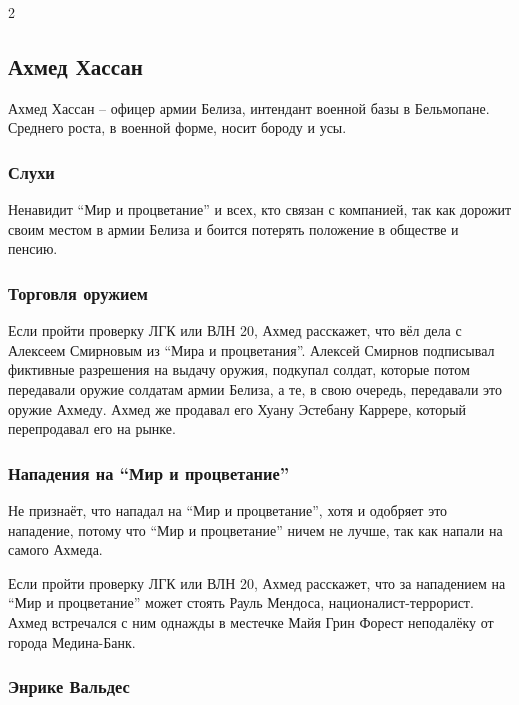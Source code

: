 \documentclass[twoside]{article}
\begin{document}
\begin{multicols}{2}
\subsection{Ахмед Хассан}\label{ahmed-hassan}

Ахмед Хассан -- офицер армии Белиза, интендант военной базы в
Бельмопане. Среднего роста, в военной форме, носит бороду и усы.

\subsubsection{Слухи}\label{rumors-hassan}

Ненавидит \enquote{Мир и процветание} и всех, кто связан с компанией, так как
дорожит своим местом в армии Белиза и боится потерять положение в
обществе и пенсию.

\subsubsection{Торговля оружием}\label{arms-trading-hassan}

Если пройти проверку ЛГК или ВЛН 20, Ахмед расскажет, что вёл дела с Алексеем
Смирновым из \enquote{Мира и процветания}. Алексей Смирнов подписывал фиктивные
разрешения на выдачу оружия, подкупал солдат, которые потом передавали
оружие солдатам армии Белиза, а те, в свою очередь, передавали это
оружие Ахмеду. Ахмед же продавал его Хуану Эстебану Каррере, который
перепродавал его на рынке.

\subsubsection{Нападения на \enquote{Мир и процветание}}\label{pap-attacks-hassan}

Не признаёт, что нападал на \enquote{Мир и процветание}, хотя и одобряет это
нападение, потому что \enquote{Мир и процветание} ничем не лучше, так как напали
на самого Ахмеда.

Если пройти проверку ЛГК или ВЛН 20, Ахмед расскажет, что за нападением на \enquote{Мир
и процветание} может стоять Рауль Мендоса, националист-террорист. Ахмед
встречался с ним однажды в местечке Майя Грин Форест неподалёку от
города Медина-Банк.

\subsubsection{Энрике Вальдес}\label{enrique-valdes}


\end{multicols}
\end{document}
